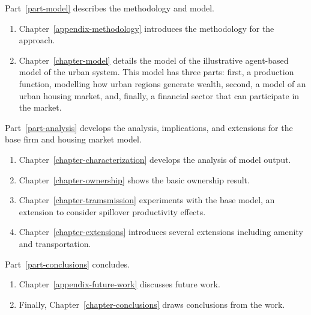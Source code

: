 \noindent Part~\ref{part-model} describes the methodology and model.

\begin{enumerate}
    \item Chapter~\ref{appendix-methodology} introduces the methodology for the approach. 

    \item Chapter~\ref{chapter-model} details the model of the illustrative agent-based model of the urban system. This model has three  parts: first, a production function, modelling how urban regions generate wealth,  second, a model of an urban housing market, and, finally, a financial sector that can participate in the market. 
\end{enumerate}

\noindent Part~\ref{part-analysis} develops the analysis, implications, and extensions for the base firm and housing market model.

\begin{enumerate}
    \item Chapter~\ref{chapter-characterization} develops the analysis of model output.

    \item Chapter~\ref{chapter-ownership} shows the basic ownership result.
    \item Chapter~\ref{chapter-tramsmission} experiments  with the base model, an extension to consider spillover productivity effects.
    \item Chapter~\ref{chapter-extensions} introduces several extensions including amenity and transportation.

\end{enumerate}

\noindent Part~\ref{part-conclusions} concludes. 

\begin{enumerate}
    \item Chapter~\ref{appendix-future-work} discusses future work. 
    \item Finally, Chapter~\ref{chapter-conclusions} draws conclusions from the work.
\end{enumerate}

% 
